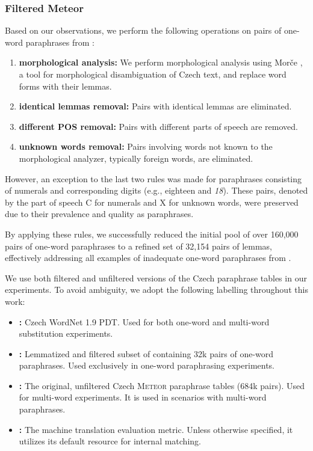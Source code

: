 \subsubsection{Filtered Meteor}
\label{filtered_meteor}
Based on our observations, we perform the following operations on pairs of one-word paraphrases from \mpt:

\begin{enumerate}
    \item \textbf{morphological analysis:} We perform morphological analysis using Morče \citep{morce:2007}, a tool for morphological disambiguation of Czech text, and replace word forms with their lemmas.
    \item \textbf{identical lemmas removal:}  Pairs with identical lemmas are eliminated.
    \item \textbf{different POS removal:}  Pairs with different parts of speech are removed.
    \item \textbf{unknown words removal:}  Pairs involving words not known to the morphological analyzer, typically foreign words, are eliminated.
\end{enumerate}

However, an exception to the last two rules was made for paraphrases consisting of numerals and corresponding digits (e.g.,  {eighteen} and \textit{18}). These pairs, denoted by the part of speech C for numerals and X for unknown words, were preserved due to their prevalence and quality as paraphrases.

By applying these rules, we successfully reduced the initial pool of over 160,000 pairs of one-word paraphrases to a refined set of 32,154 pairs of lemmas, effectively addressing all examples of inadequate one-word paraphrases from .

We use both filtered and unfiltered versions of the Czech \meteor paraphrase tables in our experiments. To avoid ambiguity, we adopt the following labelling throughout this work:

\begin{itemize}
    \item \textbf{\wordnet{}:}  Czech WordNet 1.9 PDT. Used for both one-word and multi-word substitution experiments.
    \item \textbf{\fm{}:} Lemmatized and filtered subset of \cmt containing 32k pairs of one-word paraphrases. Used exclusively in one-word paraphrasing experiments.
    \item \textbf{\cmpt{}:} The original, unfiltered Czech \textsc{Meteor} paraphrase tables (684k pairs). Used for multi-word experiments. It is used in scenarios with multi-word paraphrases.
    \item \textbf{\mn{}:} The machine translation evaluation metric. Unless otherwise specified, it utilizes its default \cmpt{} resource for internal matching.
\end{itemize}
